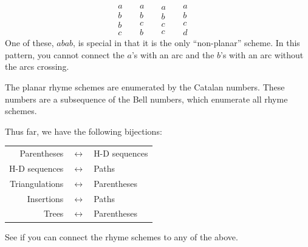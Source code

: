 \documentclass[10pt,]{book}
\theoremstyle{plain}
\theoremstyle{definition}
\theoremstyle{definition}
\theoremstyle{definition}
\theoremstyle{definition}
\numberwithin{equation}{chapter}
\begin{document}
\begin{equation*}
\begin{matrix} a \\ b \\ b \\ c \end{matrix} \quad ~
\begin{matrix} a \\ b \\ c \\ b \end{matrix} \quad ~
\begin{matrix} a \\ b \\ c \\ c \end{matrix} \quad ~
\begin{matrix} a \\ b \\ c \\ d \end{matrix} \quad ~
\end{equation*}
One of these, \(abab\), is special in that it is the only ``non-planar'' scheme. In this pattern, you cannot connect the \(a\)'s with an arc and the \(b\)'s with an arc without the arcs crossing.%
\par
\hypertarget{p-804}{}%
The planar rhyme schemes are enumerated by the Catalan numbers. These numbers are a subsequence of the Bell numbers, which enumerate all rhyme schemes.%
\par
\hypertarget{p-805}{}%
Thus far, we have the following bijections: \begin{sidebyside}{1}{0}{0}{0}
\begin{sbspanel}{1}
{\centering%
\begin{tabular}{rcl}
Parentheses&\(\leftrightarrow\)&H-D sequences\tabularnewline[0pt]
H-D sequences&\(\leftrightarrow\)&Paths\tabularnewline[0pt]
Triangulations&\(\leftrightarrow\)&Parentheses\tabularnewline[0pt]
Insertions&\(\leftrightarrow\)&Paths\tabularnewline[0pt]
Trees&\(\leftrightarrow\)&Parentheses
\end{tabular}
\par}
\end{sbspanel}
\end{sidebyside}
 See if you can connect the rhyme schemes to any of the above.%
\end{document}
